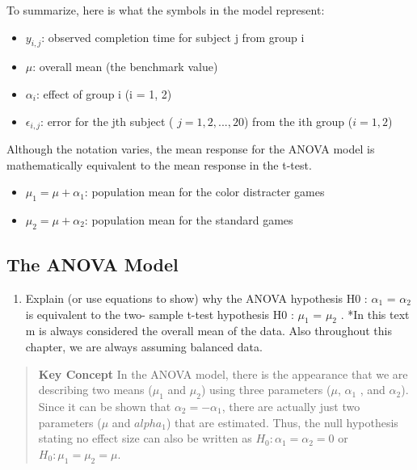 \documentclass[
]{report}
\providecommand{\tightlist}{%
  \setlength{\itemsep}{0pt}\setlength{\parskip}{0pt}}
\theoremstyle{definition}
\theoremstyle{definition}
\theoremstyle{definition}
\theoremstyle{definition}
\theoremstyle{remark}
\begin{document}
To summarize, here is what the symbols in the model represent:

\begin{itemize}
\tightlist
\item
  \(y_{i,j}\): observed completion time for subject j from group i
\item
  \(\mu\): overall mean (the benchmark value)
\item
  \(\alpha_i\): effect of group i (i = 1, 2)
\item
  \(\epsilon_{i,j}\): error for the jth subject ( \(j = 1, 2, ... , 20\)) from the ith group (\(i = 1, 2\))
\end{itemize}

Although the notation varies, the mean response for the ANOVA model is mathematically equivalent to the mean response in the t-test.

\begin{itemize}
\tightlist
\item
  \(\mu_1 = \mu + \alpha_1\): population mean for the color distracter games
\item
  \(\mu_2 = \mu + \alpha_2\): population mean for the standard games
\end{itemize}

\hypertarget{the-anova-model-1}{%
\subsection*{The ANOVA Model}\label{the-anova-model-1}}

\begin{enumerate}
\def\labelenumi{\arabic{enumi}.}
\setcounter{enumi}{15}
\tightlist
\item
  Explain (or use equations to show) why the ANOVA hypothesis H0 : \(\alpha_1\) = \(\alpha_2\) is equivalent to the two- sample t-test hypothesis H0 : \(\mu_1\) = \(\mu_2\) .
  *In this text m is always considered the overall mean of the data. Also throughout this chapter, we are always assuming balanced data.
\end{enumerate}

\begin{quote}
\textbf{Key Concept}
In the ANOVA model, there is the appearance that we are describing two means (\(\mu_1\) and \(\mu_2\)) using three parameters (\(\mu\), \(\alpha_1\) , and \(\alpha_2\)). Since it can be shown that \(\alpha_2 = -\alpha_1\), there are actually just two parameters (\(\mu\) and \(alpha_1\)) that are estimated. Thus, the null hypothesis stating no effect size can also be written as \(H_0: \alpha_1 = \alpha_2 = 0\) or \(H_0: \mu_1 = \mu_2 = \mu\).
\end{quote}
\end{document}
